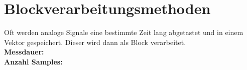 % 
% 
% 
% 
%

\section{Blockverarbeitungsmethoden}
	\begin{minipage}{0.65\textwidth}
		Oft werden analoge Signale eine bestimmte Zeit lang abgetastet und in einem Vektor gespeichert. Dieser wird dann als Block verarbeitet.\\[0.2cm]
		\textbf{Messdauer:}$\qquad\qquad\;\;$\\[0.2cm]
		\textbf{Anzahl Samples:}$\qquad$
	\end{minipage}\begin{minipage}{0.05\textwidth}$ $\end{minipage}
